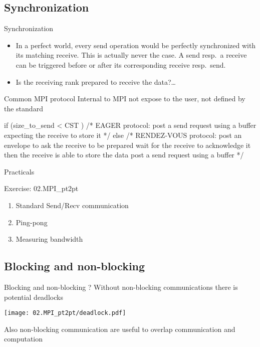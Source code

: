 \documentclass[aspectratio=43]{beamer}
\begin{document}
\subsection{Synchronization}
\begin{frame}[fragile]{Synchronization}
\justifying
\begin{itemize}
\item In a perfect world, every send operation would be perfectly synchronized with its matching receive.
This is actually never the case.
A send resp.\ a receive can be triggered before or after its corresponding receive resp.\ send.\\
\item Is the receiving rank prepared to receive the data?\ldots
\end{itemize}
\begin{blue1block}{Common MPI protocol}
{\color{cscsred}Internal to MPI not expose to the user, not defined by the standard}
\begin{Pseudolisting}{}
if (size_to_send < CST ) {
  /* EAGER protocol:
  post a send request using a buffer
  expecting the receive to store it */
} else {
  /* RENDEZ-VOUS protocol:
  post an envelope to ask the receive to be prepared
  wait for the receive to acknowledge it
  then the receive is able to store the data
  post a send request using a buffer */
}
\end{Pseudolisting}
\end{blue1block}
\end{frame}

\begin{frame}{Practicals}
    \begin{brown2block}{Exercise: 02.MPI\_pt2pt}
    \begin{enumerate}
    \item  Standard Send/Recv communication
    \item  Ping-pong
    \item  Measuring bandwidth
    \end{enumerate}
    \end{brown2block}
\end{frame}

\subsection{Blocking and non-blocking}
\begin{frame}{Blocking and non-blocking ?}
Without non-blocking communications there is potential deadlocks

\begin{center}
\texttt{[image: 02.MPI\_pt2pt/deadlock.pdf]}
\end{center}

Also non-blocking communication are useful to overlap communication and computation
\end{frame}
\end{document}
